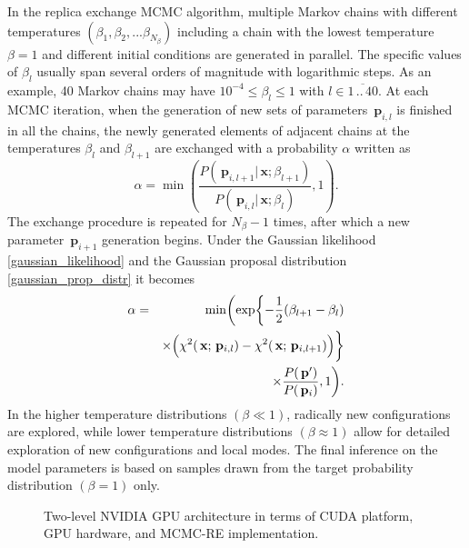 \documentclass[preprint2]{aastex}
\newcommand{\bp}{\,\mathbf{p}}
\newcommand{\bx}{\,\mathbf{x}}
\begin{document}
In the replica exchange MCMC algorithm, multiple Markov chains with different temperatures $(\beta_1,\beta_2, ... \beta_{N_\beta})$ including a chain with the lowest temperature $\beta=1$ and different initial conditions are generated in parallel. The specific values of $\beta_l$ usually span several orders of magnitude with logarithmic steps. As an example, 40 Markov chains may have $10^{-4} \leqslant \beta_l \leqslant 1$ with $l \in \overline{1\,..\,40}$. At each MCMC iteration, when the generation of new sets of parameters $\bp_{i,l}$ is finished in all the chains, the newly generated elements of adjacent chains at the temperatures $\beta_l$ and $\beta_{l+1}$ are exchanged with a probability $\alpha$ written as
\begin{equation}
  \label{exchange_probab}
  \alpha =  \min \left( \frac{P(\bp_{i,l+1}|\bx; \beta_{l+1})} 
            {P(\bp_{i,l}|\bx; \beta_{l})}, 1 \right) .
\end{equation}
The exchange procedure is repeated for $N_\beta - 1$ times, after which a new parameter $\bp_{i+1}$ generation begins. Under the Gaussian  likelihood \eqref{gaussian_likelihood} and the Gaussian proposal distribution \eqref{gaussian_prop_distr} it becomes
\begin{eqnarray}
  \label{accept_probab_beta2}
  \alpha &=& \min \biggl( \exp \biggl\lbrace -\frac{1}{2}(\beta_{l+1} - \beta_{l}) \nonumber \\
         &&\times  \Bigl( \chi^2(\bx;\bp_{i,l}) -
                 \chi^2(\bx;\bp_{i,l+1}) \Bigr) \biggr\rbrace  \nonumber \\
         &&\times \frac{P(\bp')}{P(\bp_i)}, 1 \biggr)      .
\end{eqnarray}
In the higher temperature distributions $(\beta \ll 1)$, radically new configurations are explored, while lower temperature distributions  $(\beta \approx 1)$ allow for detailed exploration of new configurations and local modes. The final inference on the model parameters is based on samples drawn from the target probability distribution $(\beta=1)$ only.


\begin{figure}[ht]    %
\caption{\small Two-level NVIDIA GPU architecture in terms of CUDA platform, GPU hardware, and MCMC-RE implementation.
\label{mcmc_cuda_hw}}
\end{figure}
\end{document}
